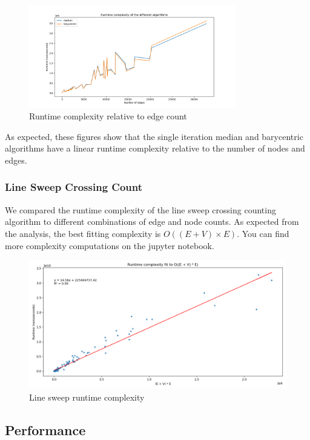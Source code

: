 \documentclass[a4paper]{article}
\begin{document}
\begin{figure}[ht]
	\centering
	\includegraphics[width=0.8\textwidth]{images/edge_runtime_complexity.png}
	\caption{Runtime complexity relative to edge count}
\end{figure}

As expected, these figures show that the single iteration median and barycentric algorithms have a linear runtime complexity relative to the number of nodes and edges.\\

\subsubsection*{Line Sweep Crossing Count}
We compared the runtime complexity of the line sweep crossing counting algorithm to different combinations of edge and node counts.
As expected from the analysis, the best fitting complexity is $O((E + V) \times E)$. You can find more complexity computations on the jupyter notebook.\\


\begin{figure}[ht]
	\centering
	\includegraphics[width=1\textwidth]{images/runtime_crossing.png}
	\caption{Line sweep runtime complexity}
\end{figure}


\subsection{Performance}
\end{document}
